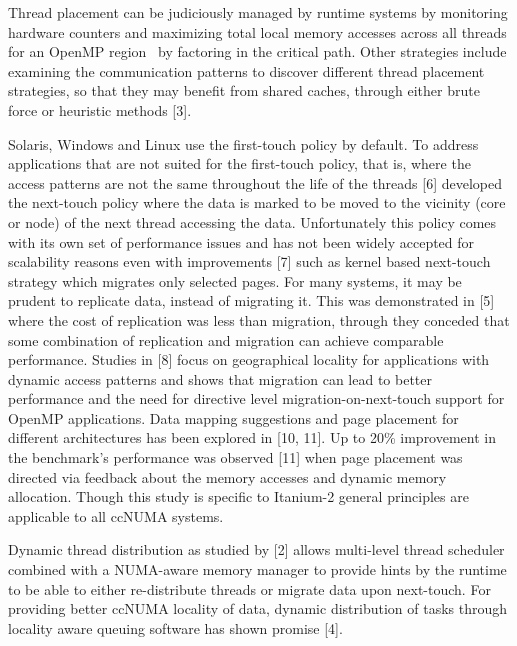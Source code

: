 Thread placement can be judiciously managed by runtime systems by monitoring hardware counters and maximizing total local memory accesses across all threads for an OpenMP region~\cite{Su:2011} by factoring in the critical path. Other strategies include examining the communication patterns to discover different thread placement strategies, so that they may benefit from shared caches, through either brute force or heuristic methods [3]. 

Solaris, Windows and Linux use the first-touch policy by default. To address applications that are not suited for the first-touch policy, that is, where the access patterns are not the same throughout the life of the threads [6] developed the next-touch policy where the data is marked to be moved to the vicinity (core or node) of the next thread accessing the data. Unfortunately this policy comes with its own set of performance issues and has not been widely accepted for scalability reasons even with improvements [7] such as kernel based next-touch strategy which migrates only selected pages. For many systems, it may be prudent to replicate data, instead of migrating it. This was demonstrated in [5] where the cost of replication was less than migration, through they conceded that some combination of replication and migration can achieve comparable performance. Studies in [8] focus on geographical locality for applications with dynamic access patterns and shows that migration can lead to better performance and the need for directive level migration-on-next-touch support for OpenMP applications. Data mapping suggestions and page placement for different architectures has been explored in [10, 11]. Up to 20\% improvement in the benchmark’s performance was observed [11] when page placement was directed via feedback about the memory accesses and dynamic memory allocation. Though this study is specific to Itanium-2 general principles are applicable to all ccNUMA systems.

Dynamic thread distribution as studied by [2] allows multi-level thread scheduler combined with a NUMA-aware memory manager to provide hints by the runtime to be able to either re-distribute threads or migrate data upon next-touch. For providing better ccNUMA locality of data, dynamic distribution of tasks through locality aware queuing software has shown promise [4].
